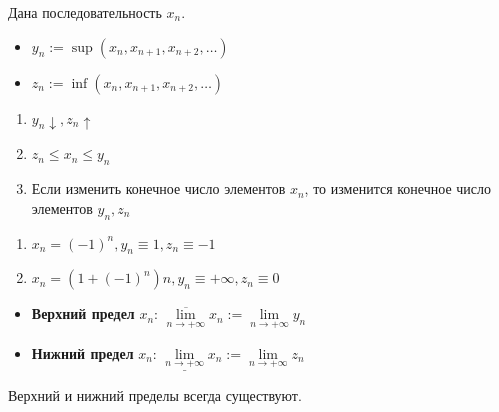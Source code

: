 \begin{definition}
    Дана последовательность $x_n$.
    \begin{itemize}
        \item $y_n:=\sup(x_n, x_{n+1}, x_{n+2},\ldots)$
        \item $z_n:=\inf(x_n, x_{n+1}, x_{n+2},\ldots)$
    \end{itemize}
\end{definition}

\begin{remark}
    \begin{enumerate}
        \item $y_n\downarrow, z_n\uparrow$
        \item $z_n\le x_n\le y_n$
        \item Если изменить конечное число элементов $x_n$, то изменится конечное число элементов $y_n, z_n$
    \end{enumerate}
\end{remark}

\begin{example}
    \begin{enumerate}
        \item $x_n=(-1)^n, y_n\equiv1, z_n\equiv-1$
        \item $x_n=(1+(-1)^n)n, y_n\equiv+\infty, z_n\equiv0$
    \end{enumerate}
\end{example}

    \begin{itemize}
        \item \textbf{Верхний предел} $x_n$: $\overline{\lim\limits_{n\to+\infty}} x_n := \lim\limits_{n\to+\infty}y_n$
        \item \textbf{Нижний предел} $x_n$: $\underline{\lim\limits_{n\to+\infty}} x_n := \lim\limits_{n\to+\infty}z_n$
    \end{itemize}
    Верхний и нижний пределы всегда существуют.

